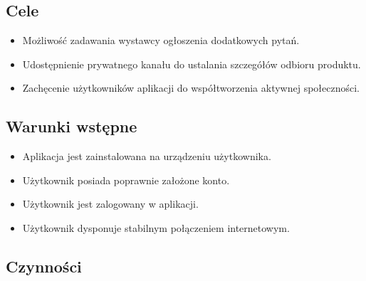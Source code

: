 \documentclass[licencjacka]{pracamgr}
\begin{document}
    \subsection{Cele}
    \begin{itemize}
        \item Możliwość zadawania wystawcy ogłoszenia dodatkowych pytań.
        \item Udostępnienie prywatnego kanału do ustalania szczegółów odbioru produktu.
        \item Zachęcenie użytkowników aplikacji do współtworzenia aktywnej społeczności.
    \end{itemize}
    \subsection{Warunki wstępne}
    \begin{itemize}
        \item Aplikacja jest zainstalowana na urządzeniu użytkownika.
        \item Użytkownik posiada poprawnie założone konto.
        \item Użytkownik jest zalogowany w aplikacji.
        \item Użytkownik dysponuje stabilnym połączeniem internetowym.
    \end{itemize}
    \subsection{Czynności}\label{r:czynnosci-link}
\end{document}
